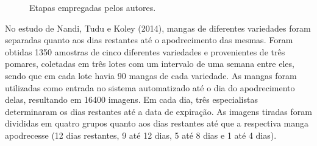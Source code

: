 \begin{figure}[!htb]
\centering
    \caption{\label{img:img_art_1} Etapas empregadas pelos autores.}
\end{figure}

No estudo de Nandi, Tudu e Koley (2014), mangas de diferentes variedades foram separadas quanto aos dias restantes até o apodrecimento das mesmas. Foram obtidas 1350 amostras de cinco diferentes variedades e provenientes de três pomares, coletadas em três lotes com um intervalo de uma semana entre eles, sendo que em cada lote havia 90 mangas de cada variedade. As mangas foram utilizadas como entrada no sistema automatizado até o dia do apodrecimento delas, resultando em 16400 imagens. Em cada dia, três especialistas determinaram os dias restantes até a data de expiração. As imagens tiradas foram divididas em quatro grupos quanto aos dias restantes até que a respectiva manga apodrecesse (12 dias restantes, 9 até 12 dias, 5 até 8 dias e 1 até 4 dias).

